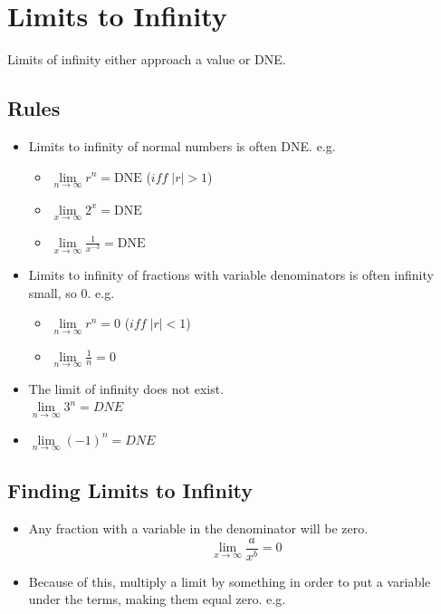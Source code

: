 \documentclass[a4paper,12pt]{article}
\begin{document}
\pagebreak

\section{Limits to Infinity}
Limits of infinity either approach a value or DNE.

\subsection{Rules}
\begin{itemize}
    \item{
        Limits to infinity of normal numbers is often DNE.
        e.g.
        \begin{itemize}
            \item{$\lim\limits_{n\to\infty}{r^n} = \textrm{DNE}$ ($i\!f\!\!f \;|r| > 1$)}
            \item{$\lim\limits_{x\to\infty}{2^x} = \textrm{DNE}$}
            \item{$\lim\limits_{x\to\infty}{\frac{1}{x^{-3}}} = \textrm{DNE}$}
        \end{itemize}
    }
    \item{
        Limits to infinity of fractions with variable denominators is often infinity small, so 0.
        e.g.
        \begin{itemize}
            \item{$\lim\limits_{n\to\infty}{r^n} = 0$ ($i\!f\!\!f \;|r| < 1$)}
            \item{$\lim\limits_{n\to\infty}{\frac{1}{n}} = 0$}
        \end{itemize}
    }
    \item{The limit of infinity does not exist. \\$\lim\limits_{n\to\infty}{3^n} = DNE$}
    \item{$\lim\limits_{n\to\infty}{(-1)^n} = DNE$}
\end{itemize}

\subsection{Finding Limits to Infinity}
\begin{itemize}
    \item{Any fraction with a variable in the denominator will be zero. $$\lim\limits_{x\to\infty}{\frac{a}{x^b}} = 0$$}
    \item{Because of this, multiply a limit by something in order to put a variable under the terms, making them equal zero. e.g.}
\end{itemize}
\end{document}
